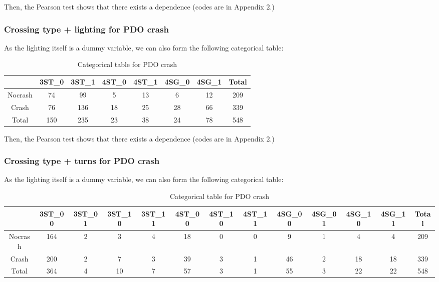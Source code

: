 \documentclass[11pt]{scrartcl} %
\begin{document}
Then, the Pearson test shows that there exists a dependence (codes are in Appendix 2.)

\subsubsection{Crossing type + lighting for PDO crash}

As the lighting itself is a dummy variable, we can also form the following categorical table:

\begin{table}[H]
\caption{Categorical table for PDO crash}
\centering
\begin{tabular}{|c|c|c|c|c|c|c|c|}
\hline
      & 3ST\_0 & 3ST\_1 & 4ST\_0 & 4ST\_1 & 4SG\_0 & 4SG\_1 & Total \\
\hline
Nocrash & 74 & 99 & 5 & 13 & 6 & 12 & 209\\
\hline
Crash    & 76  & 136  & 18 & 25 & 28 & 66 & 339\\
\hline
Total    & 150  & 235  & 23  & 38 & 24 & 78 & 548 \\
\hline
\end{tabular}
\end{table}

Then, the Pearson test shows that there exists a dependence (codes are in Appendix 2.)

\subsubsection{Crossing type + turns for PDO crash}

As the lighting itself is a dummy variable, we can also form the following categorical table:

\begin{table}[H]
\caption{Categorical table for PDO crash}
\centering
\tiny
\begin{tabular}{|c|c|c|c|c|c|c|c|c|c|c|c|c|}
\hline
      & 3ST\_00 & 3ST\_01 & 3ST\_10 & 3ST\_11 & 4ST\_00 & 4ST\_10 & 4ST\_11 & 4SG\_00 & 4SG\_01 & 4SG\_10 & 4SG\_11 & Total \\
\hline
Nocrash & 164  & 2 & 3 & 4 & 18 & 0 & 0 & 9 & 1 & 4 & 4 & 209\\
\hline
Crash   & 200  & 2 & 7 & 3 & 39 & 3 & 1 & 46 & 2 & 18 & 18 & 339 \\
\hline
Total   & 364  & 4 & 10 & 7 & 57 & 3 & 1 & 55 & 3 & 22 & 22 & 548\\
\hline
\end{tabular}
\end{table}
\end{document}
